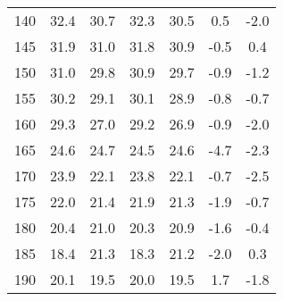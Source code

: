 \begin{longtable}{ccccccc}
    140                        & 32.4                     & 30.7                     & 32.3                       & 30.5                       & 0.5                               & -2.0                              \\
    145                        & 31.9                     & 31.0                     & 31.8                       & 30.9                       & -0.5                              & 0.4                               \\
    150                        & 31.0                     & 29.8                     & 30.9                       & 29.7                       & -0.9                              & -1.2                              \\
    155                        & 30.2                     & 29.1                     & 30.1                       & 28.9                       & -0.8                              & -0.7                              \\
    160                        & 29.3                     & 27.0                     & 29.2                       & 26.9                       & -0.9                              & -2.0                              \\
    165                        & 24.6                     & 24.7                     & 24.5                       & 24.6                       & -4.7                              & -2.3                              \\
    170                        & 23.9                     & 22.1                     & 23.8                       & 22.1                       & -0.7                              & -2.5                              \\
    175                        & 22.0                     & 21.4                     & 21.9                       & 21.3                       & -1.9                              & -0.7                              \\
    180                        & 20.4                     & 21.0                     & 20.3                       & 20.9                       & -1.6                              & -0.4                              \\
    185                        & 18.4                     & 21.3                     & 18.3                       & 21.2                       & -2.0                              & 0.3                               \\
    190                        & 20.1                     & 19.5                     & 20.0                       & 19.5                       & 1.7                               & -1.8                              \\

\end{longtable}
